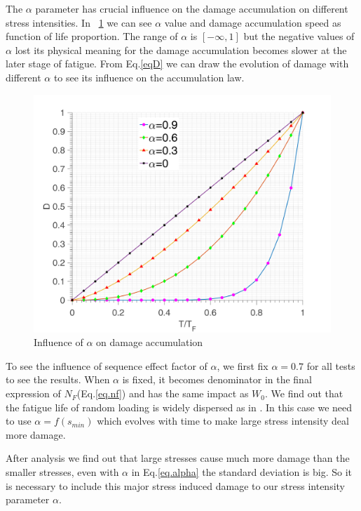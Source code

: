 \documentclass[3p,times,number,review]{elsarticle}
\newcommand{\figref}[1]{\figurename~\ref{#1}}
\begin{document}
The $\alpha$ parameter has crucial influence on the damage accumulation on different stress intensities. In \figref{fig.alpha-accumulation-speed} we can see $\alpha$ value and damage accumulation speed as function of life proportion. The range of $\alpha$ is $[-\infty,1]$ but the negative values of $\alpha$ lost its physical meaning for the damage accumulation becomes slower at the later stage of fatigue.
From Eq.\eqref{eqD} we can draw the evolution of damage with different $\alpha$ to see its influence on the accumulation law.
\begin{figure}[!h]
	\centering
	\includegraphics[width=\textwidth]{figures//alpha_accumulation_speed.png} 
	\caption{Influence of $\alpha$ on damage accumulation}
	\label{fig.alpha-accumulation-speed}
\end{figure}

To see the influence of sequence effect factor of $\alpha$, we first fix $\alpha=0.7$ for all tests to see the results. When $\alpha$ is fixed, it becomes denominator in the final expression of $N_F$(Eq.\eqref{eq.nf}) and has the same impact as $W_0$. We find out that the fatigue life of random loading is widely dispersed as in . In this case we need to use $\alpha=f(s_{min})$ which evolves with time to make large stress intensity deal more damage.




After analysis we find out that large stresses cause much more damage than the smaller stresses, even with $\alpha$ in Eq.\eqref{eq.alpha} the standard deviation is big. So it is necessary to include this major stress induced damage to our stress intensity parameter $\alpha$.
\end{document}
